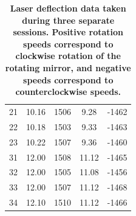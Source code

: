 \documentclass[twocolumn]{article}
\begin{document}
\begin{table}[]
\begin{tabular}{c|c c c c}
				21       & 10.16                                                          & 1506                                                        & 9.28                                                            & -1462                                                        \\
				22       & 10.18                                                          & 1503                                                        & 9.33                                                            & -1463                                                        \\
				23       & 10.22                                                          & 1507                                                        & 9.36                                                            & -1460                                                        \\ \hline
				31       & 12.00                                                          & 1508                                                        & 11.12                                                           & -1465                                                        \\
				32       & 12.00                                                          & 1505                                                        & 11.08                                                           & -1456                                                        \\
				33       & 12.00                                                          & 1507                                                        & 11.12                                                           & -1468                                                        \\
				34       & 12.10                                                          & 1510                                                        & 11.12                                                           & -1466  \\                                                  
			\end{tabular}
			\caption{\textbf{Laser deflection data taken during three separate sessions. Positive rotation speeds correspond to clockwise rotation of the rotating mirror, and negative speeds correspond to counterclockwise speeds.}}
			\label{tab:rawmeasure}
		\end{table}
		
		
		
\end{document}
